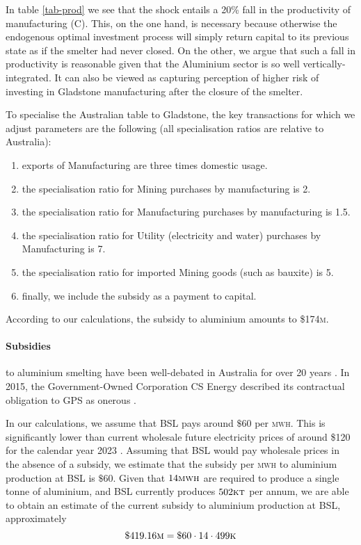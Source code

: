 \documentclass[12pt,a4paper]{article}
\begin{document}
In table \ref{tab-prod} we see that the shock entails a 20\% fall in the
productivity of manufacturing (C). This, on the one hand, is necessary because
otherwise the endogenous optimal investment process will simply return capital
to its previous state as if the smelter had never closed. On the other, we
argue that such a fall in productivity is reasonable given that the Aluminium
sector is so well vertically-integrated.  It can also be viewed as capturing
perception of higher risk of investing in Gladstone manufacturing after the
closure of the smelter.

To specialise the Australian table to Gladstone, the key transactions for which
we adjust parameters are the following (all specialisation ratios are relative to
Australia):

\begin{enumerate}
  \item exports of Manufacturing are three times domestic usage.
\item the specialisation ratio for Mining purchases by manufacturing is 2.
\item the specialisation ratio for Manufacturing purchases by manufacturing is
  1.5.
\item the specialisation ratio for Utility (electricity and water) purchases by
  Manufacturing is 7.
\item the specialisation ratio for imported Mining goods (such as bauxite) is
  5.
\item finally, we include the subsidy as a payment to capital.
\end{enumerate}

According to our calculations, the subsidy to aluminium amounts to
\$174\textsc{m}.


\paragraph{Subsidies} to aluminium smelting have been well-debated in Australia
for over 20 years \cite{subsidies}. In 2015, the Government-Owned Corporation
CS Energy  described its contractual obligation to GPS as onerous \cite[page
10]{CSE}.

In our calculations, we assume that BSL pays around $\$60$ per \textsc{mwh}.
This is significantly lower than current wholesale future electricity prices of
around \$120 for the calendar year 2023 \cite{aer}. Assuming that BSL would pay wholesale
prices in the absence of a subsidy, we estimate that the subsidy per
\textsc{mwh} to aluminium production at BSL is $\$60 $.  Given that
$14\textsc{mwh}$ are required to produce a single tonne of aluminium, and BSL
currently produces $502 \textsc{kt}$ per annum, we are able to obtain an estimate of the
current subsidy to aluminium production at BSL, approximately \[\$
419.16\textsc{m} = \$60 \cdot 14 \cdot 499\textsc{k} \] 
\end{document}

